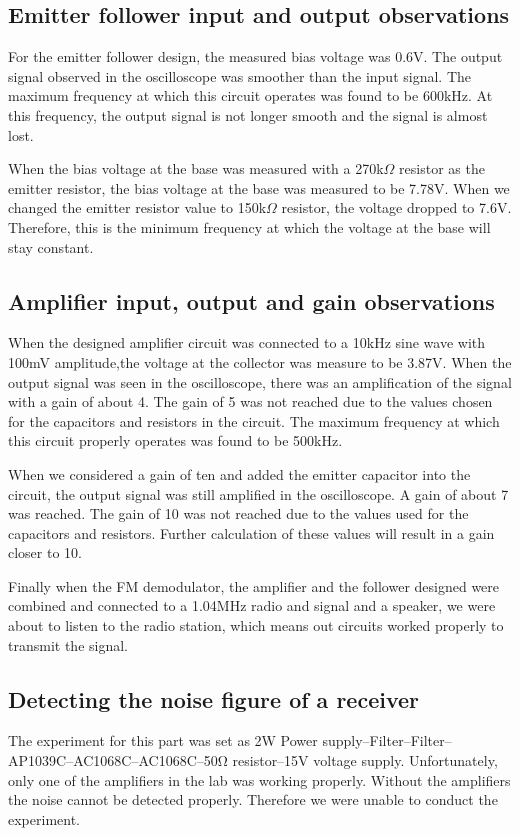 \documentclass[12pt]{article}
\begin{document}
\subsection {Emitter follower input and output observations}

For the emitter follower design, the measured bias voltage was 0.6V. The
output signal observed in the oscilloscope was smoother than the input
signal. The maximum frequency at which this circuit operates was found
to be 600kHz. At this frequency, the output signal is not longer
smooth and the signal is almost lost. 

When the bias voltage at the base was measured with a 270k$\Omega$
resistor as the emitter resistor, the bias voltage at the base was
measured to be 7.78V. When we changed the emitter resistor value to
150k$\Omega$ resistor, the voltage dropped to 7.6V. Therefore, this is
the minimum frequency at which the voltage at the base will stay
constant.

\subsection {Amplifier input, output and gain observations}
When the designed amplifier circuit was connected to a 10kHz sine wave
with 100mV amplitude,the voltage at the collector was measure to be
3.87V. When the output signal was seen in the oscilloscope, there was an
amplification of the signal with a gain of about 4. The gain of 5 was not
reached due to the values chosen for the capacitors and resistors in the
circuit. The maximum frequency at which this circuit properly operates
was found to be 500kHz. 

When we considered a gain of ten and added the emitter capacitor into
the circuit, the output signal was still amplified in the
oscilloscope. A gain of about 7 was reached. The gain of 10 was not
reached due to the values used for the capacitors and resistors. Further
calculation of these values will result in a gain closer to 10. 

Finally when the FM demodulator, the amplifier and the follower designed
were combined and connected to a 1.04MHz radio and signal and a speaker,
we were about to listen to the radio station, which means out circuits
worked properly to transmit the signal. 

\subsection {Detecting the noise figure of a receiver}
The experiment for this part was set as 2W Power
supply--Filter--Filter--AP1039C--AC1068C--AC1068C--50Ω resistor--15V
voltage supply. Unfortunately, only one of the amplifiers in the lab
was working properly. Without the amplifiers the noise cannot be detected
properly. Therefore we were unable to conduct the experiment.
\end{document}
